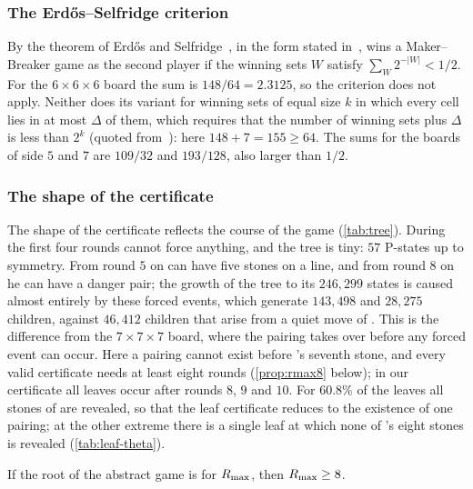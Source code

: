 \subsubsection*{The Erd\H{o}s--Selfridge criterion}
By the theorem of Erd\H{o}s and Selfridge~\cite{ErdosSelfridge1973}, in the form stated
in~\cite[Theorem~4.2]{Krivelevich2014}, \Breaker{} wins a Maker--Breaker game as the second player if the
winning sets $W$ satisfy $\sum_W 2^{-|W|}<1/2$. For the $6\times6\times6$ board the sum is
$148/64=2.3125$, so the criterion does not apply. Neither does its variant for winning sets of equal size
$k$ in which every cell lies in at most $\Delta$ of them, which requires that the number of winning
sets plus $\Delta$ is less than $2^k$ (quoted from~\cite[Theorem~6.1]{CainRaymondKallersjo2025}): here
$148+7=155\ge 64$. The sums for the boards of
side $5$ and $7$ are $109/32$ and $193/128$, also larger than $1/2$.

\subsubsection*{The shape of the certificate}
The shape of the certificate reflects the course of the game (\cref{tab:tree}). During the first
four rounds \Maker{} cannot force anything, and the tree is tiny: $57$ P-states up to symmetry. From
round $5$ on \Maker{} can have five stones on a line, and from round $8$ on he can have a danger pair;
the growth of the tree to its $246{,}299$ states is caused almost entirely by these forced events,
which generate $143{,}498$ and $28{,}275$ children, against $46{,}412$ children that arise from a quiet
move of \Maker. This is the difference from the $7\times7\times7$ board, where the pairing takes over
before any forced event can occur. Here a pairing cannot exist before \Breaker's seventh stone, and
every valid certificate needs at least eight rounds (\cref{prop:rmax8} below); in our certificate all
leaves occur after rounds $8$, $9$ and $10$. For $60.8\%$ of the leaves all stones of \Maker{} are revealed, so that
the leaf certificate reduces to the existence of one pairing; at the other extreme there is a single
leaf at which none of \Maker's eight stones is revealed (\cref{tab:leaf-theta}).

\begin{proposition}\label{prop:rmax8}
If the root of the abstract game is \WON{} for $R_{\max}$, then $R_{\max}\ge 8$.
\end{proposition}

